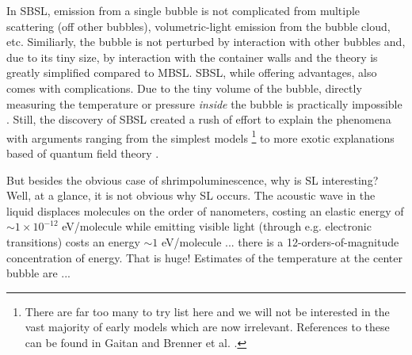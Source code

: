 \documentclass[rmp,aps,nofootinbib,superscriptaddress,floatfix,10pt]{revtex4-2}
\begin{document}
In SBSL, emission from a single bubble is not complicated from multiple scattering (off other bubbles), volumetric-light emission from the bubble cloud, etc. Similiarly, the bubble is not perturbed by interaction with other bubbles and, due to its tiny size, by interaction with the container walls and the theory is greatly simplified compared to MBSL. SBSL, while offering advantages, also comes with complications. Due to the tiny volume of the bubble, directly measuring the temperature or pressure \emph{inside} the bubble is practically impossible \cite{suslick2008inside}. Still, the discovery of SBSL created a rush of effort to explain the phenomena with arguments ranging from the simplest models \footnote{There are far too many to try list here and we will not be interested in the vast majority of early models which are now irrelevant. References to these can be found in Gaitan \cite{gaitan1990experimental} and Brenner et al. \cite{brenner2002single}.} to more exotic explanations based of quantum field theory \cite{schwinger1993casimir,eberlein1996sonoluminescence,liberati2000sonoluminescence}.


But besides the obvious case of shrimpoluminescence, why is SL interesting? Well, at a glance, it is not obvious why SL occurs. The acoustic wave in the liquid displaces molecules on the order of nanometers, costing an elastic energy of  $\sim1\times 10^{-12}$ eV/molecule while emitting visible light (through e.g. electronic transitions) costs an energy $\sim1$ eV/molecule \cite{lohse2018bubble,crum1994sonoluminescence}... there is a 12-orders-of-magnitude concentration of energy. That is huge! Estimates of the temperature at the center bubble are ...




\end{document}
